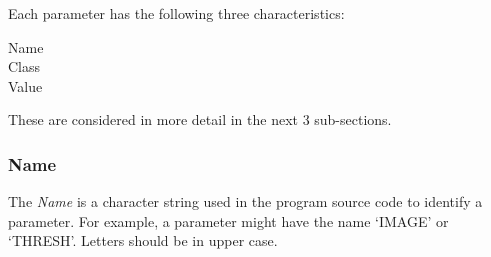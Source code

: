Each parameter has the following three characteristics:
\begin{description}
\begin{description}
\item [Name]
\item [Class]
\item [Value]
\end{description}
\end{description}
These are considered in more detail in the next 3 sub-sections.
\subsubsection {Name}
The {\em Name} is a character string used in the program source code to
identify a parameter.
For example, a parameter might have the name `IMAGE' or `THRESH'.
Letters should be in upper case.
